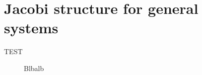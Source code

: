 \section{Jacobi structure for general systems}
\label{sec:jacobi}

TEST 
\begin{figure}
    \centering
    
    \caption{Blbalb}
    \label{fig:mdof_oscillator}
\end{figure}
